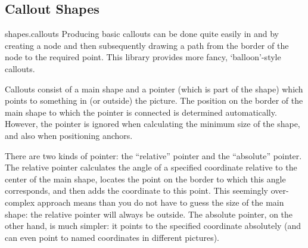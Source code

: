 \subsection{Callout Shapes}

\begin{pgflibrary}{shapes.callouts}
    Producing basic callouts can be done quite easily in \pgfname{} and
    \tikzname{} by creating a node and then subsequently drawing a path from
    the border of the node to the required point. This library provides more
    fancy, `balloon'-style callouts.
\end{pgflibrary}

Callouts consist of a main shape and a pointer (which is part of the shape)
which points to something in (or outside) the picture. The position on the
border of the main shape to which the pointer is connected is determined
automatically. However, the pointer is ignored when calculating the minimum
size of the shape, and also when positioning anchors.
%
\begin{codeexample}[preamble={\usetikzlibrary{shapes.callouts}}]
\end{codeexample}

There are two kinds of pointer: the ``relative'' pointer and the ``absolute''
pointer. The relative pointer calculates the angle of a specified coordinate
relative to the center of the main shape, locates the point on the border to
which this angle corresponds, and then adds the coordinate to this point. This
seemingly over-complex approach means than you do not have to guess the size of
the main shape: the relative pointer will always be outside. The absolute
pointer, on the other hand, is much simpler: it points to the specified
coordinate absolutely (and can even point to named coordinates in different
pictures).
%
\begin{codeexample}[preamble={\usetikzlibrary{shapes.callouts}}]
\end{codeexample}

